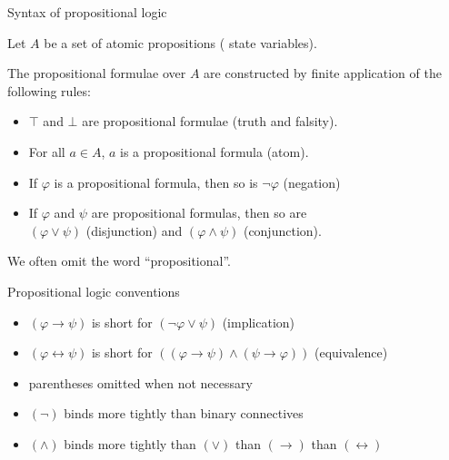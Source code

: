 \documentclass{gkibeamer}
\begin{document}
\begin{frame}{Syntax of propositional logic}
  \begin{definition}
    Let $A$ be a set of \alert{atomic propositions} (
    state variables).

    \smallskip

    The \alert{propositional formulae} over $A$ are constructed by
    finite application of the following rules:
    \begin{itemize}
    \item \alert{$\top$} and \alert{$\bot$} are propositional formulae
      (\alert{truth} and \alert{falsity}).
    \item For all $a \in A$, \alert{$a$} is a propositional formula
      (\alert{atom}).
    \item If $\varphi$ is a propositional formula, then so is
      \alert{$\neg\varphi$}
      (\alert{negation})
    \item If $\varphi$ and $\psi$ are propositional formulas, then so
      are \\
      \alert{$(\varphi \lor \psi)$} (\alert{disjunction}) and
      \alert{$(\varphi \land \psi)$} (\alert{conjunction}).
    \end{itemize}
  \end{definition}
   We often omit the word ``propositional''.
\end{frame}

\begin{frame}{Propositional logic conventions}
  \begin{itemize}
  \item \alert{$(\varphi \rightarrow \psi)$} is short for
    $(\neg \varphi \lor \psi)$ (\alert{implication})
  \item \alert{$(\varphi \leftrightarrow \psi)$} is short for
    $((\varphi \rightarrow \psi) \land (\psi \rightarrow \varphi))$
    (\alert{equivalence})
  \item parentheses omitted when not necessary
  \item $(\neg)$ binds more tightly than binary connectives
  \item $(\land)$ binds more tightly than $(\lor)$ than
    $(\rightarrow)$ than $(\leftrightarrow)$
  \end{itemize}
\end{frame}
\end{document}
